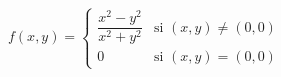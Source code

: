 \item $f(x,y) = \begin{cases} \dfrac{x^2-y^2}{x^2+y^2} & \text{si } (x,y) \neq (0,0) \\ 0 & \text{si } (x,y) = (0,0) \end{cases}$
